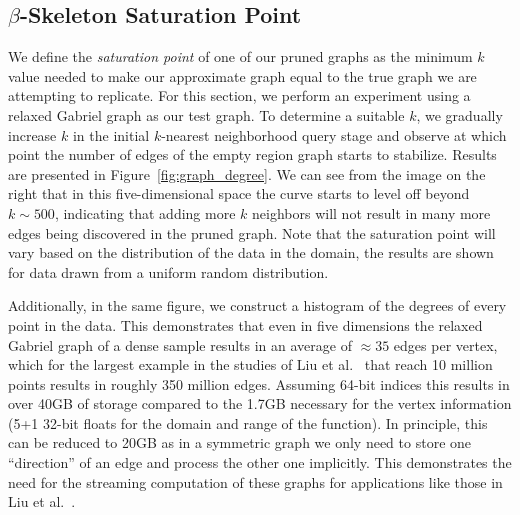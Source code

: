 \subsection{$\beta$-Skeleton Saturation Point}

We define the \textit{saturation point} of one of our pruned graphs as the minimum $k$ value needed to make our approximate graph equal to the true graph we are attempting to replicate.
%
For this section, we perform an experiment using a relaxed Gabriel graph as our test graph.
%
To determine a suitable $k$, we gradually increase $k$ in the initial $k$-nearest neighborhood query stage and observe at which point the number of edges of the empty region graph starts to stabilize.
%
Results are presented in Figure~\ref{fig:graph_degree}.
%
We can see from the image on the right that in this five-dimensional space the curve starts to level off beyond $k\sim500$, indicating that adding more $k$ neighbors will not result in many more edges being discovered in the pruned graph.
%
Note that the saturation point will vary based on the distribution of the data in the domain, the results are shown for data drawn from a uniform random distribution.

Additionally, in the same figure, we construct a histogram of the degrees of every point in the data.
%
This demonstrates that even in five dimensions the relaxed Gabriel graph of a dense sample results in an average of $\approx35$ edges per vertex, which for the largest example in the studies of Liu et al.~\cite{LiuWangMaljovec2019} that reach 10 million points results in roughly 350 million edges.
%
Assuming 64-bit indices this results in over 40GB of storage compared to the 1.7GB necessary for the vertex information (5+1 32-bit floats for the domain and range of the function).
%
In principle, this can be reduced to 20GB as in a symmetric graph we only need to store one ``direction'' of an edge and process the other one implicitly.
%
This demonstrates the need for the streaming computation of these graphs for applications like those in Liu et al.~\cite{LiuWangMaljovec2019}.

